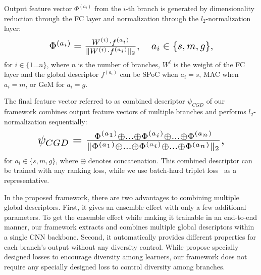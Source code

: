 \documentclass[10pt,twocolumn,letterpaper]{article}
\begin{document}
\begin{CJK}{UTF8}{mj}
Output feature vector $\Phi^{(a_i)}$ from the $i$-th branch is generated by dimensionality reduction through the FC layer and normalization through the $l_2$-normalization layer:
\begin{equation}
\resizebox{.7\hsize}{!}{
    $\Phi^{(a_i)} = { { W^{(i)} \cdot {f^{(a_i)}} } \over { \| W^{(i)} \cdot {f^{(a_i)}} \|_2 }}, \quad a_i \in \{ s, m, g \}, $
}
\end{equation}
for $i \in \{ 1 \ldots n \}$, where $n$ is the number of branches, $W^i$ is the weight of the FC layer and the global descriptor $f^{(a_i)}$ can be SPoC when $a_i=s$, MAC when $a_i=m$, or GeM for $a_i=g$.

The final feature vector referred to as combined descriptor $\psi_{CGD}$ of our framework combines output feature vectors of multiple branches and performs $l_2$-normalization sequentially:
\begin{equation}
\resizebox{.8\hsize}{!}{
    $\psi_{CGD} = { \Phi^{(a_1)} \oplus \ldots \oplus \Phi^{(a_i)} \oplus \ldots \oplus \Phi^{(a_n)} \over \| { \Phi^{(a_1)} \oplus \ldots \oplus \Phi^{(a_i)} \oplus \ldots \oplus \Phi^{(a_n)}} \|_2 },$
}
\end{equation}
for $a_i \in \{ s, m, g \}$, where $\oplus$ denotes concatenation.
This combined descriptor can be trained with any ranking loss, while we use batch-hard triplet loss~\cite{HermansBeyer2017Arxiv} as a representative.

In the proposed framework, there are two advantages to combining multiple global descriptors.
First, it gives an ensemble effect with only a few additional parameters.
To get the ensemble effect while making it trainable in an end-to-end manner, our framework extracts and combines multiple global descriptors within a single CNN backbone.
Second, it automatically provides different properties for each branch's output without any diversity control.
While \cite{Kim_2018_ECCV, opitz2016efficient} propose specially designed losses to encourage diversity among learners, our framework does not require any specially designed loss to control diversity among branches.


\end{CJK}
\end{document}
